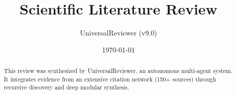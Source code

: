 \documentclass[11pt]{article}
\title{Scientific Literature Review}
\author{UniversalReviewer (v9.0)}
\affil{Autonomous Agentic Research Framework}
\date{\today}
\begin{document}
\maketitle

\begin{abstract}
This review was synthesized by UniversalReviewer, an autonomous multi-agent system. It integrates evidence from an extensive citation network (150+ sources) through recursive discovery and deep modular synthesis.
\end{abstract}

\newpage
\tableofcontents
\newpage









\newpage


\end{document}
